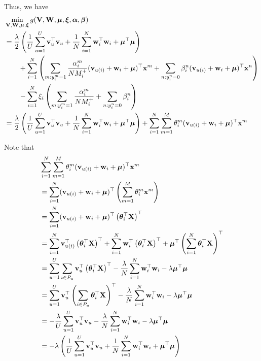 Thus, we have
\begin{equation*}
\begin{aligned}
&\min_{\mathbf{V}, \mathbf{W}, \bm{\mu}, \bm{\xi}} g(\mathbf{V}, \mathbf{W}, \bm{\mu}, \bm{\xi}, {\bm{\alpha}}, {\bm{\beta}}) \\
&= \frac{\lambda}{2} \left( \frac{1}{U} \sum_{u=1}^U \mathbf{v}_u^\top \mathbf{v}_u 
     + \frac{1}{N} \sum_{i=1}^N \mathbf{w}_i^\top \mathbf{w}_i + \bm{\mu}^\top \bm{\mu} \right) \\
& \hspace{2em}
     + \sum_{i=1}^N \left( 
       \sum_{m: y_i^m = 1} \frac{\alpha_i^m}{N M_i^+} (\mathbf{v}_{u(i)} + \mathbf{w}_i + \bm{\mu})^\top \mathbf{x}^m 
     + \sum_{n: y_i^n = 0} \beta_i^n (\mathbf{v}_{u(i)} + \mathbf{w}_i + \bm{\mu})^\top \mathbf{x}^n \right) \\
& \hspace{2em}
     - \sum_{i=1}^N \xi_i \left( \sum_{m: y_i^m = 1} \frac{\alpha_i^m}{N M_i^+} + \sum_{n: y_i^n = 0} \beta_i^n \right) \\
&= \frac{\lambda}{2} \left( \frac{1}{U} \sum_{u=1}^U \mathbf{v}_u^\top \mathbf{v}_u 
     + \frac{1}{N} \sum_{i=1}^N \mathbf{w}_i^\top \mathbf{w}_i + \bm{\mu}^\top \bm{\mu} \right)
     + \sum_{i=1}^N \sum_{m=1}^M \theta_i^m (\mathbf{v}_{u(i)} + \mathbf{w}_i + \bm{\mu})^\top \mathbf{x}^m
\end{aligned}
\end{equation*}

Note that
\begin{equation*}
\begin{aligned}
&\sum_{i=1}^N \sum_{m=1}^M \theta_i^m (\mathbf{v}_{u(i)} + \mathbf{w}_i + \bm{\mu})^\top \mathbf{x}^m \\
&= \sum_{i=1}^N (\mathbf{v}_{u(i)} + \mathbf{w}_i + \bm{\mu})^\top \left( \sum_{m=1}^M \theta_i^m \mathbf{x}^m \right) \\
&= \sum_{i=1}^N (\mathbf{v}_{u(i)} + \mathbf{w}_i + \bm{\mu})^\top \left( \bm{\theta}_i^\top \mathbf{X} \right)^\top \\
&= \sum_{i=1}^N \mathbf{v}_{u(i)}^\top \left( \bm{\theta}_i^\top \mathbf{X} \right)^\top 
     + \sum_{i=1}^N \mathbf{w}_i^\top \left( \bm{\theta}_i^\top \mathbf{X} \right)^\top 
     + \bm{\mu}^\top \left( \sum_{i=1}^N \bm{\theta}_i^\top \mathbf{X} \right)^\top \\
&= \sum_{u=1}^U \sum_{i \in P_u} \mathbf{v}_u^\top \left( \bm{\theta}_i^\top \mathbf{X} \right)^\top
     - \frac{\lambda}{N} \sum_{i=1}^N \mathbf{w}_i^\top \mathbf{w}_i 
     - \lambda \bm{\mu}^\top \bm{\mu} \\
&= \sum_{u=1}^U \mathbf{v}_u^\top \left( \sum_{i \in P_u} \bm{\theta}_i^\top \mathbf{X} \right)^\top
     - \frac{\lambda}{N} \sum_{i=1}^N \mathbf{w}_i^\top \mathbf{w}_i 
     - \lambda \bm{\mu}^\top \bm{\mu} \\
&= -\frac{\lambda}{U} \sum_{u=1}^U \mathbf{v}_u^\top \mathbf{v}_u
     - \frac{\lambda}{N} \sum_{i=1}^N \mathbf{w}_i^\top \mathbf{w}_i 
     - \lambda \bm{\mu}^\top \bm{\mu} \\
&= -\lambda \left( \frac{1}{U} \sum_{u=1}^U \mathbf{v}_u^\top \mathbf{v}_u
     + \frac{1}{N} \sum_{i=1}^N \mathbf{w}_i^\top \mathbf{w}_i 
     + \bm{\mu}^\top \bm{\mu} \right)
\end{aligned}
\end{equation*}

